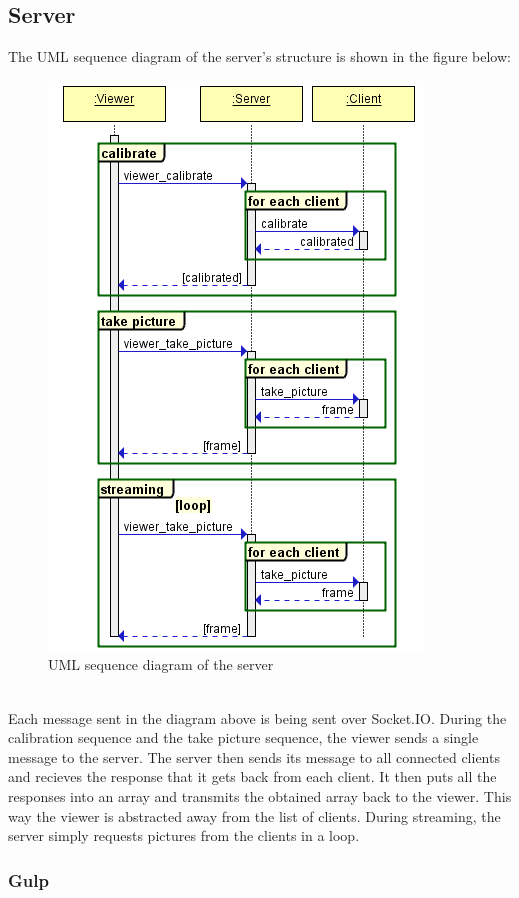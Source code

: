 \documentclass{article}
\begin{document}
\subsection{Server}
The UML sequence diagram of the server's structure is shown in the figure below:
\begin{figure}[h]
  \centering
  \includegraphics[scale=0.6]{serverUML}
  \caption{UML sequence diagram of the server}
\end{figure}
\\
Each message sent in the diagram above is being sent over Socket.IO. During the calibration sequence and the take picture sequence, the viewer sends a single message to the server. The server then sends its message to all connected clients and recieves the response that it gets back from each client. It then puts all the responses into an array and transmits the obtained array back to the viewer. This way the viewer is abstracted away from the list of clients. During streaming, the server simply requests pictures from the clients in a loop.
\subsubsection{Gulp} %
\end{document}
